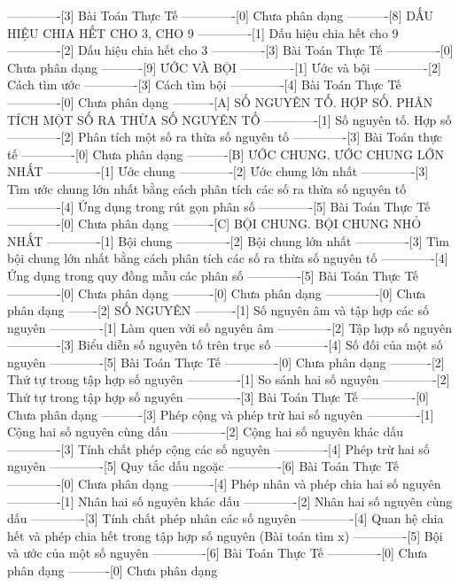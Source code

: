 -------------[3] Bài Toán Thực Tế
-------------[0] Chưa phân dạng
----------[8] DẤU HIỆU CHIA HẾT CHO 3, CHO 9
-------------[1] Dấu hiệu chia hết cho 9
-------------[2] Dấu hiệu chia hết cho 3
-------------[3] Bài Toán Thực Tế
-------------[0] Chưa phân dạng
----------[9] ƯỚC VÀ BỘI
-------------[1] Ước và bội
-------------[2] Cách tìm ước
-------------[3] Cách tìm bội
-------------[4] Bài Toán Thực Tế
-------------[0] Chưa phân dạng
----------[A] SỐ NGUYÊN TỐ. HỢP SỐ. PHÂN TÍCH MỘT SỐ RA THỪA SỐ NGUYÊN TỐ
-------------[1] Số nguyên tố. Hợp số
-------------[2] Phân tích một số ra thừa số nguyên tố
-------------[3] Bài Toán thực tế
-------------[0] Chưa phân dạng
----------[B] ƯỚC CHUNG. ƯỚC CHUNG LỚN NHẤT
-------------[1] Ước chung
-------------[2] Ước chung lớn nhất
-------------[3] Tìm ước chung lớn nhất bằng cách phân tích các số ra thừa số nguyên tố
-------------[4] Ứng dụng trong rút gọn phân số
-------------[5] Bài Toán Thực Tế
-------------[0] Chưa phân dạng
----------[C] BỘI CHUNG. BỘI CHUNG NHỎ NHẤT
-------------[1] Bội chung
-------------[2] Bội chung lớn nhất
-------------[3] Tìm bội chung lớn nhất bằng cách phân tích các số ra thừa số nguyên tố
-------------[4] Ứng dụng trong quy đồng mẫu các phân số
-------------[5] Bài Toán Thực Tế
-------------[0] Chưa phân dạng
----------[0] Chưa phân dạng
-------------[0] Chưa phân dạng
-------[2] SỐ NGUYÊN
----------[1] Số nguyên âm và tập hợp các số nguyên
-------------[1] Làm quen với số nguyên âm
-------------[2] Tập hợp số nguyên
-------------[3] Biểu diễn số nguyên tố trên trục số
-------------[4] Số đối của một số nguyên
-------------[5] Bài Toán Thực Tế
-------------[0] Chưa phân dạng
----------[2] Thứ tự trong tập hợp số nguyên
-------------[1] So sánh hai số nguyên
-------------[2] Thứ tự trong tập hợp số nguyên
-------------[3] Bài Toán Thực Tế
-------------[0] Chưa phân dạng
----------[3] Phép cộng và phép trừ hai số nguyên
-------------[1] Cộng hai số nguyên cùng dấu
-------------[2] Cộng hai số nguyên khác dấu
-------------[3] Tính chất phép cộng các số nguyên
-------------[4] Phép trừ hai số nguyên
-------------[5] Quy tắc dấu ngoặc
-------------[6] Bài Toán Thực Tế
-------------[0] Chưa phân dạng
----------[4] Phép nhân và phép chia hai số nguyên
-------------[1] Nhân hai số nguyên khác dấu
-------------[2] Nhân hai số nguyên cùng dấu
-------------[3] Tính chất phép nhân các số nguyên
-------------[4] Quan hệ chia hết và phép chia hết trong tập hợp số nguyên (Bài toán tìm x)
-------------[5] Bội và ước của một số nguyên
-------------[6] Bài Toán Thực Tế
-------------[0] Chưa phân dạng
----------[0] Chưa phân dạng
